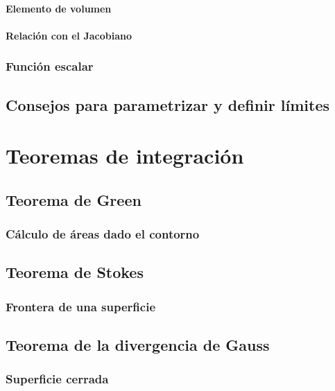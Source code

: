 \documentclass[12pt, fleqn]{report}                             %
\theoremstyle{break}                                            %
\begin{document}
                \subsubsection{Elemento de volumen}
                
                \subsubsection{Relación con el Jacobiano}
        
            \subsection{Función escalar}
            
        \section{Consejos para parametrizar y definir límites}
    
    \chapter{Teoremas de integración}
    
        \section{Teorema de Green}
        
            \subsection{Cálculo de áreas dado el contorno}
        
        \section{Teorema de Stokes}
        
            \subsection{Frontera de una superficie}
        
        \section{Teorema de la divergencia de Gauss}
        
            \subsection{Superficie cerrada}
\end{document}

